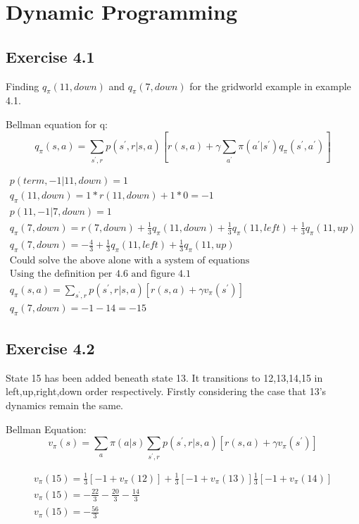 \section{Dynamic Programming}

\subsection{Exercise 4.1}
Finding $q_\pi(11,down)$ and $q_\pi(7,down)$ for the gridworld example in example 4.1.

Bellman equation for q:
\begin{equation}
  q_\pi(s,a) = \sum_{s^\prime, r} p(s^\prime, r| s,a)[r(s,a) + \gamma \sum_{a^\prime} \pi(a^\prime|s^\prime) q_\pi(s^\prime, a^\prime)]
\end{equation}

\begin{gather}
  p(term,-1 | 11,down) = 1 \\
  q_\pi(11,down) = 1*r(11,down) + 1 * 0 = -1 \\
  p(11,-1 | 7,down) = 1 \\
  q_\pi(7,down) = r(7,down) + \frac{1}{3} q_\pi(11,down) + \frac{1}{3} q_\pi(11,left) + \frac{1}{3} q_\pi(11,up) \\
  q_\pi(7,down) = -\frac{4}{3} + \frac{1}{3} q_\pi(11,left) + \frac{1}{3} q_\pi(11,up) \\
  \text{Could solve the above alone with a system of equations} \\
  \text{Using the definition per 4.6 and figure 4.1} \\
  q_\pi(s,a) = \sum_{s^\prime, r} p(s^\prime, r| s,a)[r(s,a) + \gamma v_\pi(s^\prime)] \\
  q_\pi(7,down) = -1 -14 = -15
\end{gather}


\subsection{Exercise 4.2}
State 15 has been added beneath state 13. It transitions to 12,13,14,15 in left,up,right,down order respectively. Firstly considering the case that 13's dynamics remain the same.

Bellman Equation:
\begin{equation}
  v_\pi(s) = \sum_a \pi(a|s)\sum_{s^\prime, r} p(s^\prime, r| s,a)[r(s,a) + \gamma v_\pi(s^\prime)]
\end{equation}


\begin{gather}
  v_\pi(15) = \frac{1}{3}[-1 + v_\pi(12)] + \frac{1}{3}[-1 + v_\pi(13)] \frac{1}{3}[-1 + v_\pi(14)] \\
  v_\pi(15) = -\frac{22}{3} - \frac{20}{3} - \frac{14}{3} \\
  v_\pi(15) = -\frac{56}{3}
\end{gather}

